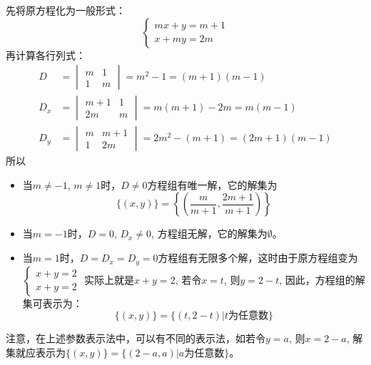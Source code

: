    
   
   \begin{solution}
先将原方程化为一般形式：
\[\begin{cases}
    mx+y=m+1\\
    x+my=2m   
\end{cases}\]
再计算各行列式：
\[\begin{split}
D&=\begin{vmatrix}
    m&1\\1&m
\end{vmatrix}=m^2-1=(m+1)(m-1)\\
D_x&=\begin{vmatrix}
    m+1&1\\2m&m
\end{vmatrix}=m(m+1)-2m=m(m-1)\\
D_y&=\begin{vmatrix}
    m&m+1\\1&2m
\end{vmatrix}=2m^2-(m+1)=(2m+1)(m-1)
\end{split}\]
所以
\begin{itemize}
    \item 当$m\ne -1$, $m\ne 1$时，$D\ne 0$方程组有唯一解，它的解集为
\[\{ (x,y) \} = \left\{ \left(\frac{m}{m+1},\frac{2m+1}{m+1}\right) \right\}\]
\item 当$m=-1$时，$D=0$, $D_x\ne 0$, 方程组无解，它的解集为$\emptyset$。
\item 当$m=1$时，$D=D_x=D_y=0$方程组有无限多个解，这时由于原方程组变为
$\begin{cases}
    x+y=2\\x+y=2
\end{cases}$
实际上就是$x+y=2$, 若令$x=t$, 则$y=2-t$, 因此，方程组的解集可表示为：
\[\{(x,y)\}=\{(t,2-t)|\text{$t$为任意数}\}\]
\end{itemize}

注意，在上述参数表示法中，可以有不同的表示法，如若令$y=a$, 则$x=2-a$, 解集就应表示为$\{(x,y)\}=\{(2-a,a)|\text{$a$为任意数}\}$。
\end{solution}

